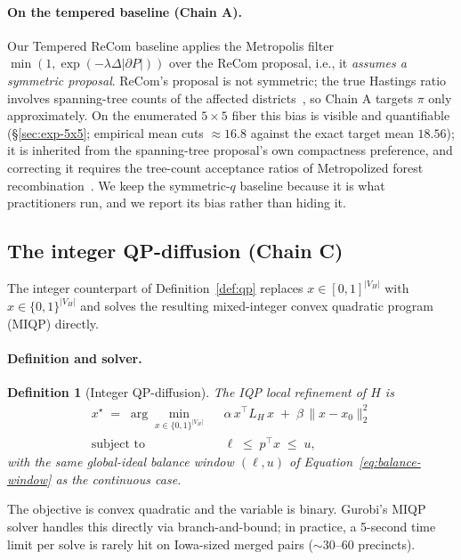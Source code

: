 \documentclass[11pt]{article}
\newtheorem{definition}{Definition}[section]
\begin{document}
\paragraph{On the tempered baseline (Chain A).} Our Tempered ReCom
baseline applies the Metropolis filter
$\min(1, \exp(-\lambda \Delta|\partial P|))$ over the ReCom proposal,
i.e., it \emph{assumes a symmetric proposal}. ReCom's proposal is not
symmetric; the true Hastings ratio involves spanning-tree counts of
the affected districts~\cite{autry2023metropolized,cannon2022spanning}, so Chain A targets $\pi$ only approximately. On the enumerated
$5 \times 5$ fiber this bias is visible and quantifiable
(\S\ref{sec:exp-5x5}; empirical mean cuts $\approx 16.8$ against the
exact target mean $18.56$); it is inherited from the spanning-tree
proposal's own compactness preference, and correcting it requires the
tree-count acceptance ratios of Metropolized forest
recombination~\cite{autry2023metropolized}. We keep the symmetric-$q$
baseline because it is what practitioners run, and we report its bias
rather than hiding it.

\subsection{The integer QP-diffusion (Chain C)}\label{sec:iqp}

The integer counterpart of Definition~\ref{def:qp} replaces
$x \in [0,1]^{|V_H|}$ with $x \in \{0, 1\}^{|V_H|}$ and solves the
resulting mixed-integer convex quadratic program (MIQP) directly.

\paragraph{Definition and solver.}\label{sec:iqp-def}

\begin{definition}[Integer QP-diffusion]\label{def:iqp}
The IQP local refinement of $H$ is
\begin{align}
  x^\star \;=\; \arg\min_{x \in \{0,1\}^{|V_H|}} \;\;
    & \alpha\, x^\top L_H\, x \;+\; \beta\, \|x - x_0\|_2^2 \label{eq:iqp-obj} \\
  \text{subject to} \;\;
    & \ell \;\le\; p^\top x \;\le\; u,
\end{align}
with the same global-ideal balance window $(\ell, u)$ of
Equation~\eqref{eq:balance-window} as the continuous case.
\end{definition}

The objective is convex quadratic and the variable is binary.
Gurobi's MIQP solver handles this directly via branch-and-bound; in
practice, a 5-second time limit per solve is rarely hit on Iowa-sized
merged pairs ($\sim 30$--$60$ precincts).
\end{document}
